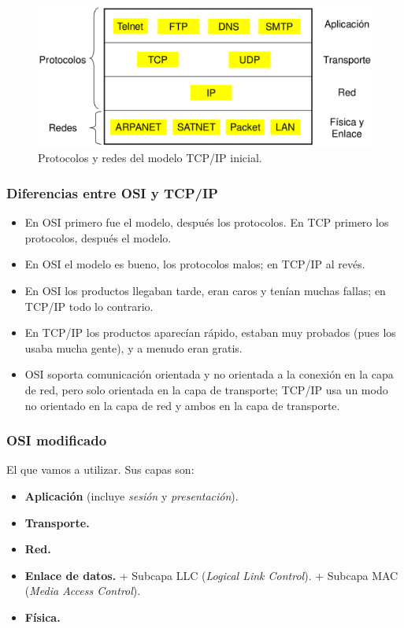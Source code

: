 \documentclass[10pt,a4paper]{article}
\begin{document}
\begin{figure}
  \caption{Protocolos y redes del modelo TCP/IP inicial.}
  \label{fig:tcp_ip}  
  \centering
  \hbox{\includegraphics[width=0.5\textwidth-\fboxrule-\fboxrule]{imgs/tcp_ip.png}}  
\end{figure}

\subsubsection{Diferencias entre OSI y TCP/IP}
\begin{itemize}
\item En OSI primero fue el modelo, después los protocolos. En TCP primero los protocolos, después el modelo.
\item En OSI el modelo es bueno, los protocolos malos; en TCP/IP al revés.
\item En OSI los productos llegaban tarde, eran caros y tenían muchas fallas; en TCP/IP todo lo contrario.
\item En TCP/IP los productos aparecían rápido, estaban muy probados (pues los usaba mucha gente), y a menudo eran gratis.
\item OSI soporta comunicación orientada y no orientada a la conexión en la capa de red, pero solo orientada en la capa de transporte; TCP/IP usa un modo no orientado en la capa de red y ambos en la capa de transporte.
\end{itemize}

\subsubsection{OSI modificado}
El que vamos a utilizar. Sus capas son:
\begin{itemize}
\item \textbf{Aplicación} (incluye \textit{sesión} y \textit{presentación}).
\item \textbf{Transporte.}
\item \textbf{Red.}
\item \textbf{Enlace de datos.}
\subitem + Subcapa LLC (\textit{Logical Link Control}).
\subitem + Subcapa MAC (\textit{Media Access Control}).
\item \textbf{Física.}
\end{itemize}
\end{document}
